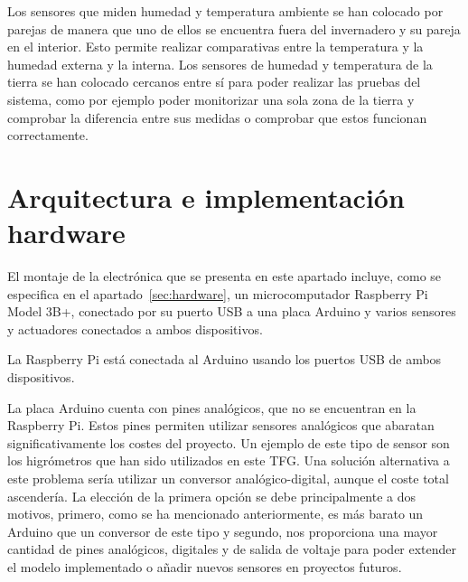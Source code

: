 \documentclass[a4paper, 12pt, oneside]{book}
\begin{document}
Los sensores que miden humedad y temperatura ambiente se han colocado por parejas de manera que uno de ellos se encuentra fuera del invernadero y su pareja en el interior. Esto permite realizar comparativas entre la temperatura y la humedad externa y la interna. Los sensores de humedad y temperatura de la tierra se han colocado cercanos entre sí para poder realizar las pruebas del sistema, como por ejemplo poder monitorizar una sola zona de la tierra y comprobar la diferencia entre sus medidas o comprobar que estos funcionan correctamente.    

\section{Arquitectura e implementación hardware}
\label{sec:Arquitectura e implementación hardware}
El montaje de la electrónica que se presenta en este apartado incluye, como se especifica en el apartado~\ref{sec:hardware}, un microcomputador Raspberry Pi Model 3B+, conectado por su puerto USB a una placa Arduino y varios sensores y actuadores conectados a ambos dispositivos.

La Raspberry Pi está conectada al Arduino usando los puertos USB de ambos dispositivos.
%

La placa Arduino cuenta con pines analógicos, que no se encuentran en la Raspberry Pi. Estos pines permiten utilizar sensores analógicos que abaratan significativamente los costes del proyecto. Un ejemplo de este tipo de sensor son los higrómetros que han sido utilizados en este TFG. Una solución alternativa a este problema sería utilizar un conversor analógico-digital, aunque el coste total ascendería. La elección de la primera opción se debe principalmente a dos motivos, primero, como se ha mencionado anteriormente, es más barato un Arduino que un conversor de este tipo y segundo, nos proporciona una mayor cantidad de pines analógicos, digitales y de salida de voltaje para poder extender el modelo implementado o añadir nuevos sensores en proyectos futuros.
\end{document}
